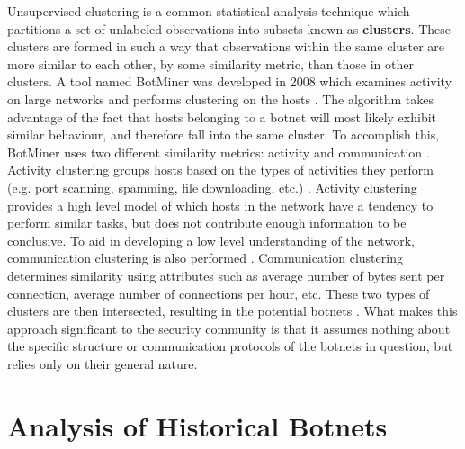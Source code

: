 Unsupervised clustering is a common statistical analysis technique which partitions a set of unlabeled
observations into subsets known as \textbf{clusters}.  These clusters are formed in
such a way that observations within the
same cluster are more similar to each other, by some similarity metric, than
those in other clusters. A tool named BotMiner was developed in 2008 which examines
activity on large networks and performs clustering on the hosts \cite{clustering}.
The algorithm takes advantage of the fact that hosts belonging to a botnet will most
likely exhibit similar behaviour, and therefore fall into the same cluster.
To accomplish this, BotMiner uses two different similarity metrics: activity and
communication \cite{clustering}.  Activity clustering groups hosts based on the
types of activities they perform (e.g. port scanning, spamming, file downloading,
etc.) \cite{clustering}.  Activity clustering provides a high level model of which
hosts in the network have a tendency to perform similar tasks, but does not contribute enough
information to be conclusive.  To aid in developing a low level understanding
of the network, communication clustering is also performed \cite{clustering}.
Communication clustering determines similarity using attributes such as average
number of bytes sent per connection, average number of connections per hour, etc.
These two types of clusters are then intersected, resulting in the potential
botnets \cite{clustering}.  What makes this approach significant to the security community
is that it assumes nothing about the specific structure or communication protocols of
the botnets in question, but relies only on their general nature.

\section{Analysis of Historical Botnets}

